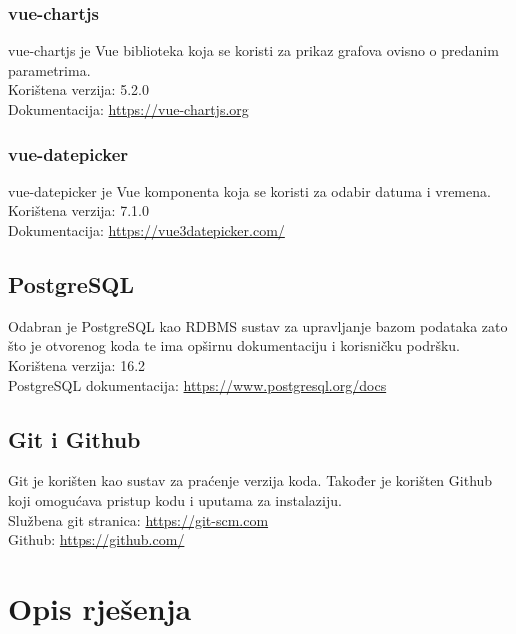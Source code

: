 \documentclass[zavrsnirad]{fer}
\begin{document}
\subsection{vue-chartjs}
\label{pog:chart.vue}
vue-chartjs je Vue biblioteka koja se koristi za prikaz grafova ovisno o predanim parametrima.
\\Korištena verzija: 5.2.0
\\Dokumentacija: \url{https://vue-chartjs.org}

\subsection{vue-datepicker}
vue-datepicker je Vue komponenta koja se koristi za odabir datuma i vremena.
\\Korištena verzija: 7.1.0
\\Dokumentacija: \url{https://vue3datepicker.com/}

\section{PostgreSQL}
\label{pog:postgresql}
Odabran je PostgreSQL kao RDBMS sustav za upravljanje bazom podataka zato što je otvorenog koda te ima opširnu dokumentaciju i korisničku podršku.
\\Korištena verzija: 16.2
\\PostgreSQL dokumentacija: \url{https://www.postgresql.org/docs}

\section{Git i Github}
Git je korišten kao sustav za praćenje verzija koda. Također je korišten Github koji omogućava pristup kodu i uputama za instalaziju.
\\Službena git stranica: \url{https://git-scm.com}
\\Github: \url{https://github.com/}


\chapter{Opis rješenja}
\label{pog:opis_rjesenja}
\end{document}
